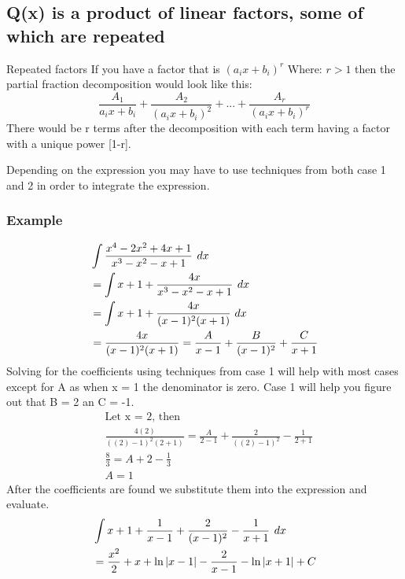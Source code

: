 \documentclass[letterpaper,10pt,twoside,twocolumn,openany]{book}
\begin{document}
\subsection{Q(x) is a product of linear factors, some of which are repeated}
\begin{paperbox}{Repeated factors}
    If you have a factor that is $(a_ix + b_i)^r$ Where: $ r > 1$ then the partial fraction decomposition would look like this:
    \begin{equation}
        \frac{A_1}{a_ix+b_i} + \frac{A_2}{(a_ix+b_i)^2} + ... + \frac{A_r}{(a_ix+b_i)^r}
    \end{equation}
    There would be r terms after the decomposition with each term having a factor with a unique power [1-r]. 
\end{paperbox}
Depending on the expression you may have to use techniques from both case 1 and 2 in order to integrate the expression.

\subsubsection{Example}
\begin{align*}    
    &\large\int \frac{x^4 - 2x^2 + 4x + 1}{x^3 - x^2 - x + 1}\ dx\\
    &=\large\int x + 1 + \frac{4x}{x^3 - x^2 - x + 1}\ dx\\ 
    &=\int x + 1 + \frac{4x}{(x - 1)^2 (x+1)}\ dx\\
    &=\frac{4x}{(x - 1)^2 (x+1)} = \frac{A}{x-1} + \frac{B}{(x - 1)^2} + \frac{C}{x + 1}
\end{align*}
Solving for the coefficients using techniques from case 1 will help with most cases except for A as when x = 1 the denominator is zero. Case 1 will help you figure out that B = 2 an C = -1.
\begin{align*}
    &\text{Let x = 2, then}\\
    &\frac{4(2)}{((2)-1)^2(2+1)} = \frac{A}{2 - 1} + \frac{2}{((2)-1)^2} - \frac{1}{2+1}\\
    &\frac{8}{3} = A + 2 - \frac{1}{3}\\
    &A = 1 
\end{align*}
After the coefficients are found we substitute them into the expression and evaluate.
$$\begin{aligned}
    &\large\int x + 1 +  \frac{1}{x-1} + \frac{2}{(x - 1)^2} - \frac{1}{x + 1}\ dx\\
    &= \frac{x^2}{2} + x + \ln{|x-1|} - \frac{2}{x-1} - \ln{|x + 1|} + C
\end{aligned}$$
\newpage
\end{document}
